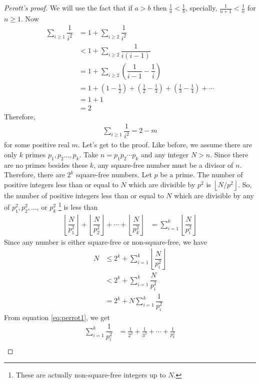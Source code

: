 \documentclass{subfiles}
\begin{document}
		\begin{proof}[Perott's proof]
			We will use the fact that if $a>b$ then $\frac1a<\frac1b$, specially, $\frac1{n+1}<\frac1n$ for $n\geq1$. Now
				\begin{align*}
					\sum_{i\geq1}\dfrac1{i^2} 	& = 1+ \sum_{i\geq2}\dfrac1{i^2}\\
												& < 1+\sum_{i\geq2}\dfrac1{i(i-1)}\\
												& = 1+\sum_{i\geq2}\left(\dfrac1{i-1}-\dfrac1{i}\right)\\
												& = 1+\left(1 - \frac 12 \right) + \left(\frac 12 - \frac 13\right) + \left(\frac 13 - \frac 14\right)  + \cdots\\
												& = 1+1\\
												& =2
				\end{align*}
			Therefore,
				\begin{align}
					\sum_{i\geq1}\dfrac1{i^2} =  2-m\label{eq:perrot1}
				\end{align}
			for some positive real $m$.
			Let's get to the proof. Like before, we assume there are only $k$ primes $p_1,p_2\ldots,p_k$. Take $n=p_1p_2\cdots p_k$ and any integer $N>n$. Since there are no primes besides these $k$, any square-free number must be a divisor of $n$. Therefore, there are $2^k$ square-free numbers. Let $p$ be a prime. The number of positive integers less than or equal to $N$ which are divisible by $p^2$ is $\left\lfloor N/{p^2}\right\rfloor$. So, the number of positive integers less than or equal to $N$ which are divisible by any of $p_1^2,p_2^2,\ldots$, or $p_k^2$ \footnote{These are actually non-square-free integers up to $N$.} is less than
				\begin{align*}
					\left\lfloor\dfrac N{p_1^2}\right\rfloor+\left\lfloor\dfrac N{p_2^2}\right\rfloor+\cdots+\left\lfloor\dfrac N{p_k^2}\right\rfloor
						& = \sum_{i=1}^k \left\lfloor\dfrac N{p_i^2}\right\rfloor
				\end{align*}
			Since any number is either square-free or non-square-free, we have
				\begin{align}
				N	& \leq2^k+\sum_{i=1}^k \left\lfloor\dfrac N{p_i^2}\right\rfloor \nonumber\\
					& < 2^k+\sum_{i=1}^k \dfrac N{p_i^2} \nonumber\\
					& = 2^k+N\sum_{i=1}^k \dfrac 1{p_i^2}\label{eq:perrot2}
				\end{align}
			From equation \eqref{eq:perrot1}, we get
				\begin{align*}
					\sum_{i=1}^k \dfrac 1{p_i^2} & = \frac{1}{2^2}+ \frac{1}{3^2}+ \cdots + \frac{1}{p_k^2} \\

\end{align*}
\end{proof}
\end{document}
